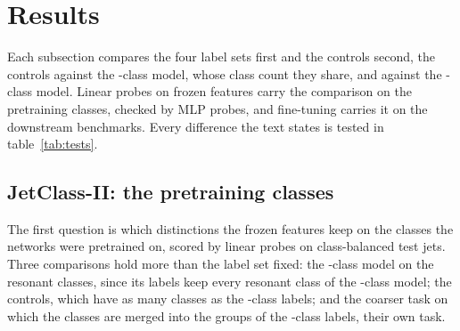 
\section{Results}\label{sec:results}

Each subsection compares the four label sets first and the controls second, the
controls against the \Kcoarse-class model, whose class count they share, and against the \Kfull-class model. Linear probes on frozen features
carry the comparison on the pretraining classes, checked by MLP probes, and fine-tuning carries it on the
downstream benchmarks. Every difference the text states is tested in table~\ref{tab:tests}.

\subsection{JetClass-II: the pretraining classes}\label{sec:jetclasstwo}

The first question is which distinctions the frozen features keep on the \Kfull{} classes the networks
were pretrained on, scored by linear probes on class-balanced test jets. Three comparisons hold more than the
label set fixed: the \Kres-class model on the resonant classes, since its labels keep every resonant class of the
\Kfull-class model; the controls, which have as many classes as the \Kcoarse-class labels; and the coarser task on
which the \Kfull{} classes are merged into the \Kcoarse{} groups of the \Kcoarse-class labels, their own task.


